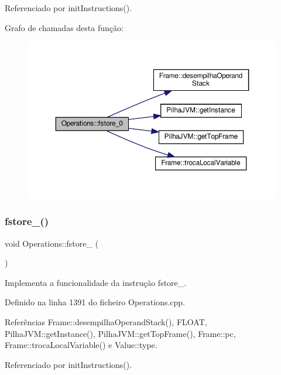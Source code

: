 Referenciado por init\+Instructions().

Grafo de chamadas desta função\+:
\nopagebreak
\begin{figure}[H]
\begin{center}
\leavevmode
\includegraphics[width=350pt]{classOperations_a7465534bbf4e4ca9f0493a8dbe645d46_cgraph}
\end{center}
\end{figure}
\mbox{\label{classOperations_a2ea876acd29db9eec798302229bfd5e5}} 
\subsubsection{\texorpdfstring{fstore\+\_()}{fstore\_1()}}
{\footnotesize\ttfamily void Operations\+::fstore\+\_ (\begin{DoxyParamCaption}{ }\end{DoxyParamCaption})\hspace{0.3cm}{\ttfamily [private]}}



Implementa a funcionalidade da instrução fstore\+\_. 



Definido na linha 1391 do ficheiro Operations.\+cpp.



Referências Frame\+::desempilha\+Operand\+Stack(), F\+L\+O\+AT, Pilha\+J\+V\+M\+::get\+Instance(), Pilha\+J\+V\+M\+::get\+Top\+Frame(), Frame\+::pc, Frame\+::troca\+Local\+Variable() e Value\+::type.



Referenciado por init\+Instructions().

